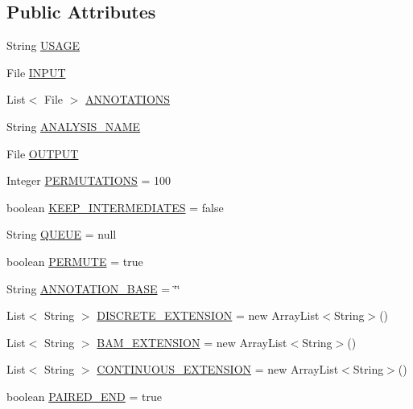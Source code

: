 \subsection*{Public Attributes}
\begin{DoxyCompactItemize}
\item 
String \hyperlink{classbroad_1_1pda_1_1seq_1_1rap_1_1_collect_annotation_enrichments_ab37d1fbdfd1e2cb829d8eb0b7a9e2b47}{U\+S\+A\+G\+E}
\item 
File \hyperlink{classbroad_1_1pda_1_1seq_1_1rap_1_1_collect_annotation_enrichments_af5ba078f10c4cfcac377cf0469c71407}{I\+N\+P\+U\+T}
\item 
List$<$ File $>$ \hyperlink{classbroad_1_1pda_1_1seq_1_1rap_1_1_collect_annotation_enrichments_a48e62da8261ef539be64b1ab429c6138}{A\+N\+N\+O\+T\+A\+T\+I\+O\+N\+S}
\item 
String \hyperlink{classbroad_1_1pda_1_1seq_1_1rap_1_1_collect_annotation_enrichments_a0da3a0d1f37f9a8a294fae63c17a2f8b}{A\+N\+A\+L\+Y\+S\+I\+S\+\_\+\+N\+A\+M\+E}
\item 
File \hyperlink{classbroad_1_1pda_1_1seq_1_1rap_1_1_collect_annotation_enrichments_aeab7d98dbd5d934d66a80a2603a1aff6}{O\+U\+T\+P\+U\+T}
\item 
Integer \hyperlink{classbroad_1_1pda_1_1seq_1_1rap_1_1_collect_annotation_enrichments_a87f81c1a937af644848870df06ddf02a}{P\+E\+R\+M\+U\+T\+A\+T\+I\+O\+N\+S} = 100
\item 
boolean \hyperlink{classbroad_1_1pda_1_1seq_1_1rap_1_1_collect_annotation_enrichments_ac4f6f2378f28ccc588d6d7d5f97d3e35}{K\+E\+E\+P\+\_\+\+I\+N\+T\+E\+R\+M\+E\+D\+I\+A\+T\+E\+S} = false
\item 
String \hyperlink{classbroad_1_1pda_1_1seq_1_1rap_1_1_collect_annotation_enrichments_aebdccdcadf5f886a471d5fabce63b368}{Q\+U\+E\+U\+E} = null
\item 
boolean \hyperlink{classbroad_1_1pda_1_1seq_1_1rap_1_1_collect_annotation_enrichments_a8851c2e5ce1654a08306fe7872585dfe}{P\+E\+R\+M\+U\+T\+E} = true
\item 
String \hyperlink{classbroad_1_1pda_1_1seq_1_1rap_1_1_collect_annotation_enrichments_a3df5b629b6288ce7772f8cc3419db331}{A\+N\+N\+O\+T\+A\+T\+I\+O\+N\+\_\+\+B\+A\+S\+E} = \char`\"{}\char`\"{}
\item 
List$<$ String $>$ \hyperlink{classbroad_1_1pda_1_1seq_1_1rap_1_1_collect_annotation_enrichments_a4af85e744a3a2443c738428a73256e90}{D\+I\+S\+C\+R\+E\+T\+E\+\_\+\+E\+X\+T\+E\+N\+S\+I\+O\+N} = new Array\+List$<$String$>$()
\item 
List$<$ String $>$ \hyperlink{classbroad_1_1pda_1_1seq_1_1rap_1_1_collect_annotation_enrichments_a5bd37a75439dc03a2737db8baf48602d}{B\+A\+M\+\_\+\+E\+X\+T\+E\+N\+S\+I\+O\+N} = new Array\+List$<$String$>$()
\item 
List$<$ String $>$ \hyperlink{classbroad_1_1pda_1_1seq_1_1rap_1_1_collect_annotation_enrichments_af0f4ff2d7acf7fc97467f5e7b8443eab}{C\+O\+N\+T\+I\+N\+U\+O\+U\+S\+\_\+\+E\+X\+T\+E\+N\+S\+I\+O\+N} = new Array\+List$<$String$>$()
\item 
boolean \hyperlink{classbroad_1_1pda_1_1seq_1_1rap_1_1_collect_annotation_enrichments_abd3d42378821803c2ce0ce6806e33815}{P\+A\+I\+R\+E\+D\+\_\+\+E\+N\+D} = true
\end{DoxyCompactItemize}
